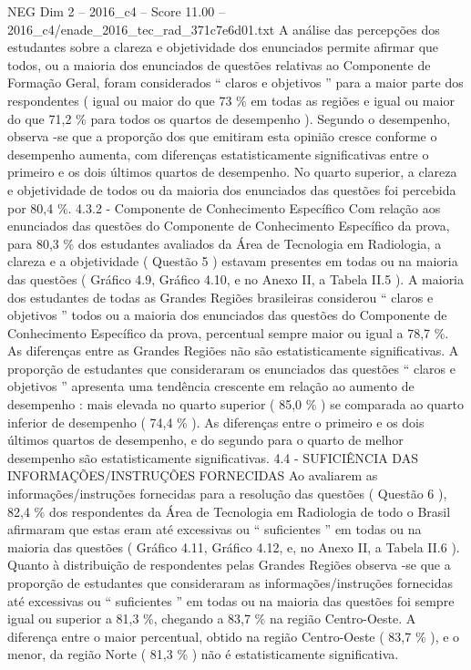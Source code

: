 \begin{textsample}{NEG Dim 2 – 2016\_c4 – Score 11.00 – 2016\_c4/enade\_2016\_tec\_rad\_371c7e6d01.txt}
A análise das percepções dos estudantes sobre a clareza e objetividade dos enunciados permite afirmar que todos, ou a maioria dos enunciados de questões relativas ao Componente de Formação Geral, foram considerados “ claros e objetivos ” para a maior parte dos respondentes ( igual ou maior do que 73 \% em todas as regiões e igual ou maior do que 71,2 \% para todos os quartos de desempenho ).
Segundo o desempenho, observa -se que a proporção dos que emitiram esta opinião cresce conforme o desempenho aumenta, com diferenças estatisticamente significativas entre o primeiro e os dois últimos quartos de desempenho.
No quarto superior, a clareza e objetividade de todos ou da maioria dos enunciados das questões foi percebida por 80,4 \%. 4.3.2 - Componente de Conhecimento Específico Com relação aos enunciados das questões do Componente de Conhecimento Específico da prova, para 80,3 \% dos estudantes avaliados da Área de Tecnologia em Radiologia, a clareza e a objetividade ( Questão 5 ) estavam presentes em todas ou na maioria das questões ( Gráfico 4.9, Gráfico 4.10, e no Anexo II, a Tabela II.5 ).
A maioria dos estudantes de todas as Grandes Regiões brasileiras considerou “ claros e objetivos ” todos ou a maioria dos enunciados das questões do Componente de Conhecimento Específico da prova, percentual sempre maior ou igual a 78,7 \%.
As diferenças entre as Grandes Regiões não são estatisticamente significativas.
A proporção de estudantes que consideraram os enunciados das questões “ claros e objetivos ” apresenta uma tendência crescente em relação ao aumento de desempenho : mais elevada no quarto superior ( 85,0 \% ) se comparada ao quarto inferior de desempenho ( 74,4 \% ).
As diferenças entre o primeiro e os dois últimos quartos de desempenho, e do segundo para o quarto de melhor desempenho são estatisticamente significativas. 4.4 - SUFICIÊNCIA DAS INFORMAÇÕES/INSTRUÇÕES FORNECIDAS Ao avaliarem as informações/instruções fornecidas para a resolução das questões ( Questão 6 ), 82,4 \% dos respondentes da Área de Tecnologia em Radiologia de todo o Brasil afirmaram que estas eram até excessivas ou “ suficientes ” em todas ou na maioria das questões ( Gráfico 4.11, Gráfico 4.12, e, no Anexo II, a Tabela II.6 ).
Quanto à distribuição de respondentes pelas Grandes Regiões observa -se que a proporção de estudantes que consideraram as informações/instruções fornecidas até excessivas ou “ suficientes ” em todas ou na maioria das questões foi sempre igual ou superior a 81,3 \%, chegando a 83,7 \% na região Centro-Oeste.
A diferença entre o maior percentual, obtido na região Centro-Oeste ( 83,7 \% ), e o menor, da região Norte ( 81,3 \% ) não é estatisticamente significativa.

\end{textsample}
